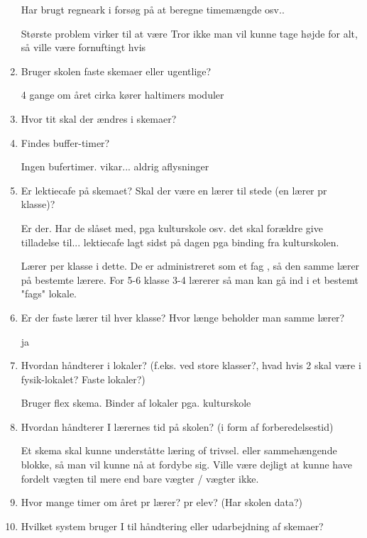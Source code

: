 \begin{enumerate}
Har brugt regneark i forsøg på at beregne timemængde osv..

Største problem virker til at være 
Tror ikke man vil kunne tage højde for alt, så ville være fornuftingt hvis 
	
	\item Bruger skolen faste skemaer eller ugentlige?
	
	4 gange om året cirka
	kører haltimers moduler 

	\item Hvor tit skal der ændres i skemaer?


	\item Findes buffer-timer? 
	
	Ingen bufertimer. vikar... aldrig aflysninger
	

	\item Er lektiecafe på skemaet? Skal der være en lærer til stede (en lærer pr klasse)?

	Er der. Har de slåset med, pga kulturskole osv. det skal forældre give tilladelse til... lektiecafe lagt sidst på dagen pga binding fra kulturskolen.  

Lærer per klasse i dette. De er administreret som et fag , så den samme lærer på bestemte lærere. For 5-6 klasse 3-4 lærerer så man kan gå ind i et bestemt "fags" lokale. 
	
	\item Er der faste lærer til hver klasse? Hvor længe beholder man samme lærer?

	ja
	
	\item Hvordan håndterer i lokaler? (f.eks. ved store klasser?, hvad hvis 2 skal være i fysik-lokalet? Faste lokaler?)
	
	Bruger flex skema. Binder af lokaler pga. kulturskole
	
	\item Hvordan håndterer I lærernes tid på skolen? (i form af forberedelsestid)
	
	Et skema skal kunne underståtte læring of trivsel. eller sammehængende blokke, så man vil kunne nå at fordybe sig. Ville være dejligt at kunne have fordelt vægten til mere end bare vægter / vægter ikke. 
	
	\item Hvor mange timer om året pr lærer? pr elev? (Har skolen data?)
	
	
	
	\item Hvilket system bruger I til håndtering eller udarbejdning af skemaer?



\end{enumerate}
